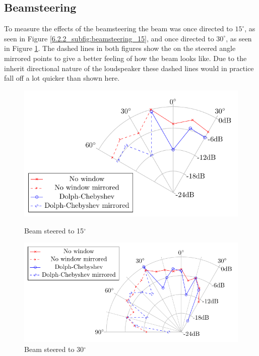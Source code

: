 \subsection{Beamsteering}
To measure the effects of the beamsteering the beam was once directed to $15^\circ$, as seen in Figure \ref{6.2.2_subfig:beamsteering_15}, and once directed to $30^\circ$, as seen in Figure \ref{6.2.2_subfig:beamsteering_30}. The dashed lines in both figures show the on the steered angle mirrored points to give a better feeling of how the beam looks like. Due to the inherit directional nature of the loudspeaker these dashed lines would in practice fall off a lot quicker than shown here. 
\begin{figure}[h!]
    \begin{minipage}{0.49\textwidth}
        \centering
        \includegraphics[width=\linewidth]{images/6_Measurements/Polar_PlotSteering_Measurement_15.pdf}
        \caption{Beam steered to 15$^\circ$}
        \label{6.2.2_subfig:beamsteering_15}
    \end{minipage}
    \begin{minipage}{0.49\textwidth}
        \centering
        \includegraphics[width=\linewidth]{images/6_Measurements/Polar_PlotSteering_Measurement_30.pdf}
        \caption{Beam steered to 30$^\circ$}
         \label{6.2.2_subfig:beamsteering_30}
    \end{minipage}
\end{figure}
